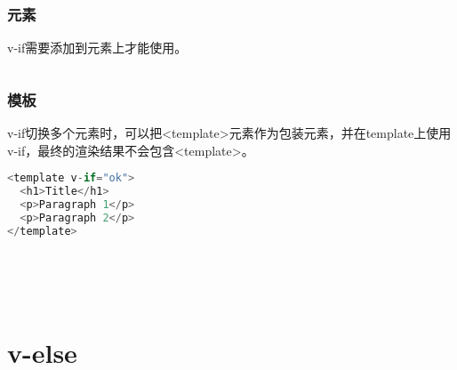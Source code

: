\subsubsection{元素}

v-if需要添加到元素上才能使用。

\begin{lstlisting}[language=JavaScript]

\end{lstlisting}


\subsubsection{模板}

v-if切换多个元素时，可以把<template>元素作为包装元素，并在template上使用v-if，最终的渲染结果不会包含<template>。


\begin{lstlisting}[language=JavaScript]
<template v-if="ok">
  <h1>Title</h1>
  <p>Paragraph 1</p>
  <p>Paragraph 2</p>
</template>
\end{lstlisting}




\begin{lstlisting}[language=JavaScript]

\end{lstlisting}




\begin{lstlisting}[language=JavaScript]

\end{lstlisting}




\begin{lstlisting}[language=JavaScript]

\end{lstlisting}




\begin{lstlisting}[language=JavaScript]

\end{lstlisting}




\begin{lstlisting}[language=JavaScript]

\end{lstlisting}

\section{v-else}

